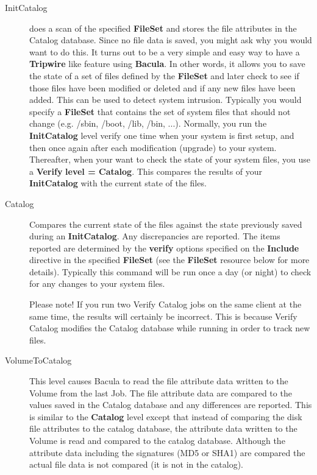 \begin{description}
\begin{description}
\item [InitCatalog]
   does a scan of the specified {\bf FileSet} and stores the file
   attributes in the Catalog database.  Since no file data is saved, you
   might ask why you would want to do this.  It turns out to be a very
   simple and easy way to have a {\bf Tripwire} like feature using {\bf
   Bacula}.  In other words, it allows you to save the state of a set of
   files defined by the {\bf FileSet} and later check to see if those files
   have been modified or deleted and if any new files have been added.
   This can be used to detect system intrusion.  Typically you would
   specify a {\bf FileSet} that contains the set of system files that
   should not change (e.g.  /sbin, /boot, /lib, /bin, ...).  Normally, you
   run the {\bf InitCatalog} level verify one time when your system is
   first setup, and then once again after each modification (upgrade) to
   your system.  Thereafter, when your want to check the state of your
   system files, you use a {\bf Verify} {\bf level = Catalog}.  This
   compares the results of your {\bf InitCatalog} with the current state of
   the files.

\item [Catalog]
   Compares the current state of the files against the state previously
   saved during an {\bf InitCatalog}.  Any discrepancies are reported.  The
   items reported are determined by the {\bf verify} options specified on
   the {\bf Include} directive in the specified {\bf FileSet} (see the {\bf
   FileSet} resource below for more details).  Typically this command will
   be run once a day (or night) to check for any changes to your system
   files.

   Please note!  If you run two Verify Catalog jobs on the same client at
   the same time, the results will certainly be incorrect.  This is because
   Verify Catalog modifies the Catalog database while running in order to
   track new files.

\item [VolumeToCatalog]
   This level causes Bacula to read  the file attribute data written to the
Volume from the last Job.  The file attribute data are compared to the values
saved in the  Catalog database and any differences are reported. This is 
similar to the {\bf Catalog} level except that instead of  comparing the disk
file attributes to the catalog database, the  attribute data written to the
Volume is read and compared to the  catalog database. Although the attribute
data including the  signatures (MD5 or SHA1) are compared the actual file data
is not  compared (it is not in the catalog). 


\end{description}
\end{description}
